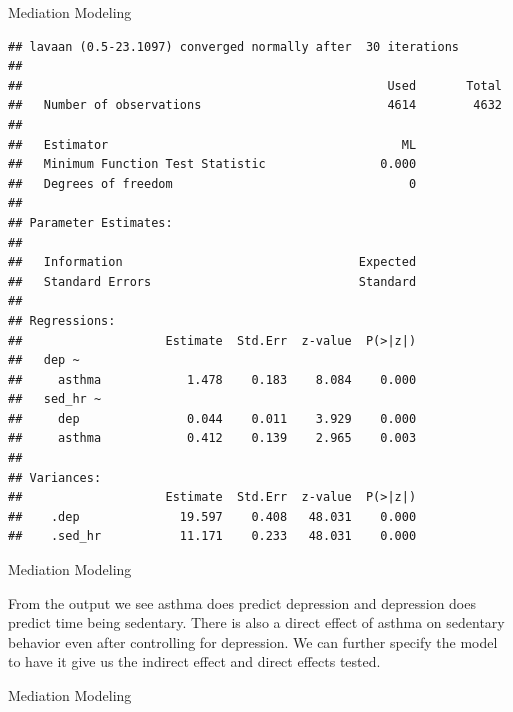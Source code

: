 \begin{frame}[fragile]{Mediation Modeling}

\tiny

\begin{verbatim}
## lavaan (0.5-23.1097) converged normally after  30 iterations
## 
##                                                   Used       Total
##   Number of observations                          4614        4632
## 
##   Estimator                                         ML
##   Minimum Function Test Statistic                0.000
##   Degrees of freedom                                 0
## 
## Parameter Estimates:
## 
##   Information                                 Expected
##   Standard Errors                             Standard
## 
## Regressions:
##                    Estimate  Std.Err  z-value  P(>|z|)
##   dep ~                                               
##     asthma            1.478    0.183    8.084    0.000
##   sed_hr ~                                            
##     dep               0.044    0.011    3.929    0.000
##     asthma            0.412    0.139    2.965    0.003
## 
## Variances:
##                    Estimate  Std.Err  z-value  P(>|z|)
##    .dep              19.597    0.408   48.031    0.000
##    .sed_hr           11.171    0.233   48.031    0.000
\end{verbatim}

\end{frame}

\begin{frame}{Mediation Modeling}

From the output we see asthma does predict depression and depression
does predict time being sedentary. There is also a direct effect of
asthma on sedentary behavior even after controlling for depression. We
can further specify the model to have it give us the indirect effect and
direct effects tested.

\end{frame}

\begin{frame}[fragile]{Mediation Modeling}

\footnotesize

\begin{Shaded}
\begin{Highlighting}[]
\StringTok{ }
\StringTok{ }
\end{Highlighting}
\end{Shaded}

\end{frame}

